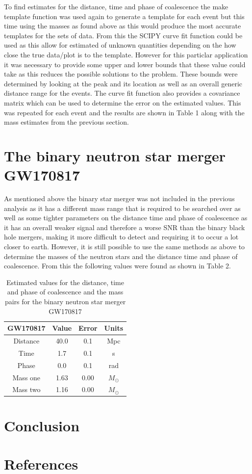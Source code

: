 \documentclass[]{article}
\begin{document}
To find estimates for the distance, time and phase of coalescence the make template function was used again
to generate a template for each event but this time using the masses as found above
as this would produce the most accurate templates for the sets of data.
From this the SCIPY curve fit function could be used as this allow for estimated of unknown quantities depending on the
how close the true data/plot is to the template. However for this particlar application
it was necessary to provide some upper and lower bounds that these value could take as this reduces the possible solutions
to the problem. These bounds were determined by looking at the peak and its location as well as an overall generic distance range
for the events. The curve fit function also provides a covariance matrix which can be used to determine the error on the
estimated values. This was repeated for each event and the results are shown in Table 1 along with the mass estimates from the previous section.




\section*{The binary neutron star merger GW170817}
As mentioned above the binary star merger was not included in the previous analysis as it has a different mass range that is required to be
searched over as well as some tighter parameters on the distance time and phase of coalescence as it has an overall weaker signal and therefore
a worse SNR than the binary black hole mergers, making it more difficult to detect and requiring it to occur a lot closer to earth.
However, it is still possible to use the same methods as above to determine the masses of the neutron stars and the distance time and phase of coalescence.
From this the following values were found as shown in Table 2.
\begin{table}[h]
    \begin{center}
        \begin{tabular}{|c c c c|}
            \hline
            GW170817 & Value & Error & Units\\
            \hline
            Distance & 40.0 & 0.1 & Mpc\\
            Time & 1.7 & 0.1 & s\\
            Phase & 0.0 & 0.1 & rad\\
            Mass one & 1.63 & 0.00 & $M_{\odot}$\\
            Mass two & 1.16 & 0.00 & $M_{\odot}$\\
            \hline
        \end{tabular}
        \caption{Estimated values for the distance, time and phase of coalescence and the mass pairs for the binary neutron star merger GW170817}
        \label{tab:estimates}
    \end{center}
\end{table}

\section*{Conclusion}

\section*{References}
\end{document}
